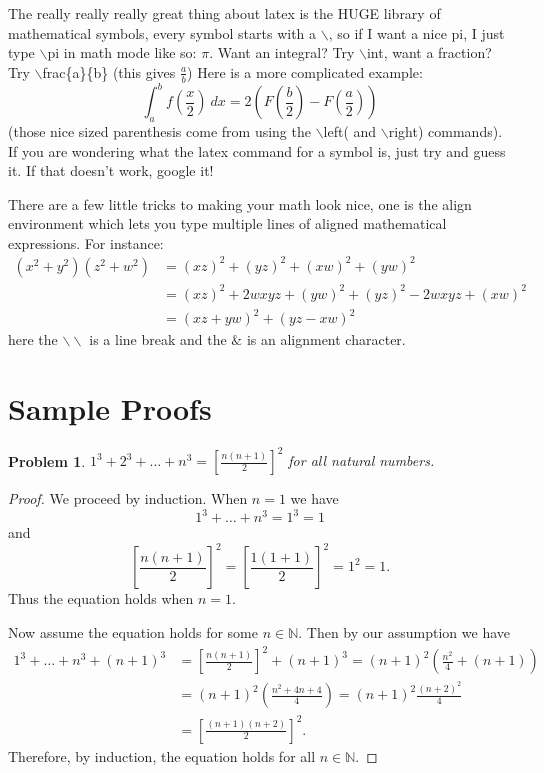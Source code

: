 \documentclass[12pt]{article}
\newtheorem{problem}{Problem}
\theoremstyle{remark}  %
\begin{document}
The really really really great thing about latex is the HUGE library of mathematical symbols, every symbol starts with a $\backslash$, so if I want a nice pi, I just type $\backslash$pi in math mode like so: $\pi$. Want an integral? Try $\backslash$int, want a fraction? Try $\backslash$frac\{a\}\{b\} (this gives $\frac{a}{b}$) Here is a more complicated example:
$$
\int_a^b f \left(\frac{x}{2} \right) \ dx =2\left( F\left(\frac{b}{2} \right) - F\left(\frac{a}{2}\right) \right)
$$
(those nice sized parenthesis come from using the $\backslash$left( and $\backslash$right) commands). If you are wondering what the latex command for a symbol is, just try and guess it. If that doesn't work, google it!

There are a few little tricks to making your math look nice, one is the align environment which lets you type multiple lines of aligned mathematical expressions. For instance:
\begin{align*}
(x^2+y^2)(z^2+w^2) & = (xz)^2 + (yz)^2 + (xw)^2 + (yw)^2 \\
& =  (xz)^2 + 2wxyz + (yw)^2 + (yz)^2 - 2 wxyz + (xw)^2 \\
&= (xz+yw)^2 + (yz-xw)^2
\end{align*}
here the $\backslash\backslash$ is a line break and the $\&$ is an alignment character. 
\section{Sample Proofs}
\begin{problem} $1^3+2^3+\ldots +n^3 = \left[ \frac{n(n+1)}{2}\right]^2$  for all natural numbers. 

\end{problem}
 
\begin{proof}
We proceed by induction. When $n=1$ we have 
$$
1^3 + \ldots + n^3 = 1^3 =1
$$
and
$$
\left[ \frac{n(n+1)}{2}\right]^2=\left[ \frac{1(1+1)}{2}\right]^2 = 1^2 =1.
$$
Thus the equation holds when $n=1$.

Now assume the equation holds for some $n \in \mathbb N$. Then by our assumption we have
\begin{align*}
1^3 + \ldots + n^3 + (n+1)^3& =   \left[ \frac{n(n+1)}{2}\right]^2 + (n+1)^3 = (n+1)^2\left( \frac{n^2}{4} + (n+1)\right) \\
&=(n+1)^2\left( \frac{n^2+4n+4}{4} \right) = (n+1)^2\frac{(n+2)^2}{4}  \\ &=  \left[ \frac{(n+1)(n+2)}{2}\right]^2.
\end{align*}
Therefore, by induction, the equation holds for all $n\in \mathbb N$.
\end{proof}
\end{document}
